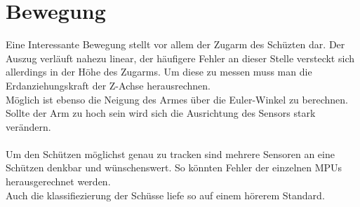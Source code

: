 \section {Bewegung}
Eine Interessante Bewegung stellt vor allem der Zugarm des 
Schüzten dar. Der Auszug verläuft nahezu linear, der häufigere Fehler 
an dieser Stelle versteckt sich allerdings in der Höhe des Zugarms. 
Um diese zu messen muss man die Erdanziehungskraft der Z-Achse herausrechnen.\\
Möglich ist ebenso die Neigung des Armes über die Euler-Winkel zu berechnen. Sollte 
der Arm zu hoch sein wird sich die Ausrichtung des Sensors stark verändern.\\
\\
Um den Schützen möglichst genau zu tracken sind mehrere Sensoren an eine Schützen denkbar und
wünschenswert. So könnten Fehler der einzelnen MPUs herausgerechnet werden.\\
Auch die klassifiezierung der Schüsse liefe so auf einem hörerem Standard.
\\




